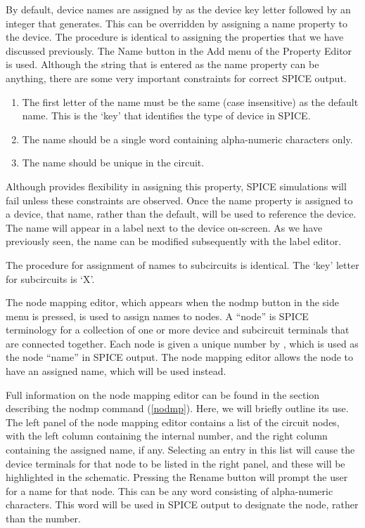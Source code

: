 By default, device names are assigned by {\Xic} as the device key
letter followed by an integer that {\Xic} generates.  This can be
overridden by assigning a {\et name} property to the device.  The
procedure is identical to assigning the properties that we have
discussed previously.  The {\cb Name} button in the {\cb Add} menu of
the {\cb Property Editor} is used.  Although the string that is
entered as the name property can be anything, there are some very
important constraints for correct SPICE output.

\begin{enumerate}
\item{The first letter of the name must be the same (case insensitive)
  as the default name.  This is the `key' that identifies the type of
  device in SPICE.}

\item{The name should be a single word containing alpha-numeric
  characters only.}

\item{The name should be unique in the circuit.}
\end{enumerate}

Although {\Xic} provides flexibility in assigning this property, SPICE
simulations will fail unless these constraints are observed.  Once the
name property is assigned to a device, that name, rather than the
default, will be used to reference the device.  The name will appear
in a label next to the device on-screen.  As we have previously seen,
the name can be modified subsequently with the label editor.

The procedure for assignment of names to subcircuits is identical. 
The `key' letter for subcircuits is `{\vt X}'.

The node mapping editor, which appears when the {\cb nodmp} button in
the side menu is pressed, is used to assign names to nodes.  A
``node'' is SPICE terminology for a collection of one or more device
and subcircuit terminals that are connected together.  Each node is
given a unique number by {\Xic}, which is used as the node ``name'' in
SPICE output.  The node mapping editor allows the node to have an
assigned name, which will be used instead.

Full information on the node mapping editor can be found in the
section describing the {\cb nodmp} command (\ref{nodmp}).  Here, we
will briefly outline its use.  The left panel of the node mapping
editor contains a list of the circuit nodes, with the left column
containing the internal number, and the right column containing the
assigned name, if any.  Selecting an entry in this list will cause the
device terminals for that node to be listed in the right panel, and
these will be highlighted in the schematic.  Pressing the {\cb Rename}
button will prompt the user for a name for that node.  This can be any
word consisting of alpha-numeric characters.  This word will be used
in SPICE output to designate the node, rather than the number.

